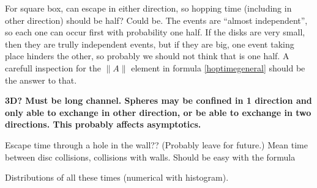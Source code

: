 \documentclass[a4paper,10pt]{article}
\begin{document}
For square box, can escape in either direction, so hopping time (including in other direction) should be half? Could be. The events are ``almost independent'', so each one
can occur first with probability one half. If the disks are very small, then
they are trully independent events, but if they are big, one event taking
place hinders the other, so probably we should not think that is 
one half. A carefull inspection for the $\|A\|$ element in formula \ref{hoptimegeneral}
should be the answer to that.


\textbf{ 3D?  Must be long channel. Spheres may be confined in 1 direction  and only able to exchange in other direction, or be able to exchange in two directions.
This probably affects asymptotics.}

Escape time through a hole in the wall?? (Probably leave for future.)
Mean time between disc collisions, collisions with walls. Should be easy with the formula

Distributions of all these times (numerical with histogram).



\end{document}
